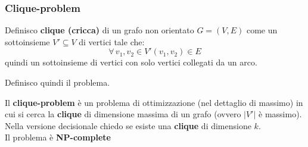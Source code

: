 \subsubsection{Clique-problem}
\begin{definizione}
  Definisco \textbf{clique (\textup{cricca})} di un grafo non orientato
  $G=(V,E)$ come un sottoinsieme $V'\subseteq V$ di vertici tale che:
  \[\forall \,v_1,v_2\in V' (v_1,v_2)\in E\]
  quindi un sottoinsieme di vertici con solo vertici collegati da un arco.
\end{definizione}
Definisco quindi il problema.
\begin{definizione}
  Il \textbf{clique-problem} è un problema di ottimizzazione (nel
  dettaglio di massimo) in cui si cerca la \textbf{clique} di dimensione massima
  di un grafo (ovvero $|V'|$ è massimo). Nella versione decisionale chiedo se
  esiste una \textbf{clique} di dimensione $k$.\\
  Il problema è \textbf{NP-complete}
\end{definizione}
